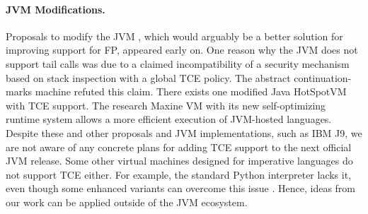 \paragraph{JVM Modifications.}
Proposals to modify the JVM \cite{League2001}, which would arguably be a better
solution for improving support for FP,
appeared early on. One reason why the JVM does not support tail calls
was due to a claimed incompatibility of a security mechanism based on
stack inspection with a global TCE policy. The abstract
continuation-marks machine \cite{Clements2004} refuted this
claim. There exists one modified Java HotSpot\texttrademark VM
\cite{Schwaighofer2009} with TCE support. The research Maxine VM
with its new self-optimizing runtime system \cite{Wuerthinger2013}
allows a more efficient execution of JVM-hosted languages. Despite
these and other proposals and JVM implementations, such as IBM J9, we
are not aware of any concrete plans for adding TCE support to the
next official JVM release. Some other virtual machines designed for
imperative languages do not support TCE either. For example, the
standard Python interpreter lacks it, even though some enhanced
variants can overcome this issue \cite{Tismer2000}. Hence, ideas from our
work can be applied outside of the JVM ecosystem.
